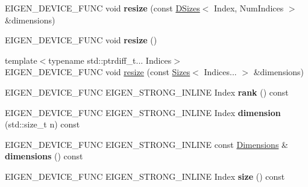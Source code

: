 \begin{DoxyCompactItemize}
\item 
\mbox{\label{class_eigen_1_1_tensor_a78f1708920dfe6d76bb547f6f68a3ce2}} 
E\+I\+G\+E\+N\+\_\+\+D\+E\+V\+I\+C\+E\+\_\+\+F\+U\+NC void {\bfseries resize} (const \hyperlink{struct_eigen_1_1_d_sizes}{D\+Sizes}$<$ Index, Num\+Indices $>$ \&dimensions)
\item 
\mbox{\label{class_eigen_1_1_tensor_ab4b4f5f9a27507f115c0399ed7e7b398}} 
E\+I\+G\+E\+N\+\_\+\+D\+E\+V\+I\+C\+E\+\_\+\+F\+U\+NC void {\bfseries resize} ()
\item 
{\footnotesize template$<$typename std\+::ptrdiff\+\_\+t... Indices$>$ }\\E\+I\+G\+E\+N\+\_\+\+D\+E\+V\+I\+C\+E\+\_\+\+F\+U\+NC void \hyperlink{class_eigen_1_1_tensor_a4f637a19784e5d0391882bd9fab0917e}{resize} (const \hyperlink{struct_eigen_1_1_sizes}{Sizes}$<$ Indices... $>$ \&dimensions)
\item 
\mbox{\label{class_eigen_1_1_tensor_af3ae187be5d5419f416348fd59287bc3}} 
E\+I\+G\+E\+N\+\_\+\+D\+E\+V\+I\+C\+E\+\_\+\+F\+U\+NC E\+I\+G\+E\+N\+\_\+\+S\+T\+R\+O\+N\+G\+\_\+\+I\+N\+L\+I\+NE Index {\bfseries rank} () const
\item 
\mbox{\label{class_eigen_1_1_tensor_ac0a1bb6142d4e5c4d15ba25beccb26a5}} 
E\+I\+G\+E\+N\+\_\+\+D\+E\+V\+I\+C\+E\+\_\+\+F\+U\+NC E\+I\+G\+E\+N\+\_\+\+S\+T\+R\+O\+N\+G\+\_\+\+I\+N\+L\+I\+NE Index {\bfseries dimension} (std\+::size\+\_\+t n) const
\item 
\mbox{\label{class_eigen_1_1_tensor_a2aae1ea69ec73eab862d4534ee00dac6}} 
E\+I\+G\+E\+N\+\_\+\+D\+E\+V\+I\+C\+E\+\_\+\+F\+U\+NC E\+I\+G\+E\+N\+\_\+\+S\+T\+R\+O\+N\+G\+\_\+\+I\+N\+L\+I\+NE const \hyperlink{struct_eigen_1_1_d_sizes}{Dimensions} \& {\bfseries dimensions} () const
\item 
\mbox{\label{class_eigen_1_1_tensor_a890988b2e1dd992d9b905e0a6a488587}} 
E\+I\+G\+E\+N\+\_\+\+D\+E\+V\+I\+C\+E\+\_\+\+F\+U\+NC E\+I\+G\+E\+N\+\_\+\+S\+T\+R\+O\+N\+G\+\_\+\+I\+N\+L\+I\+NE Index {\bfseries size} () const
\item 
\mbox{\label{class_eigen_1_1_tensor_ae09663818399750cf150181aaed47b99}} 

\end{DoxyCompactItemize}
